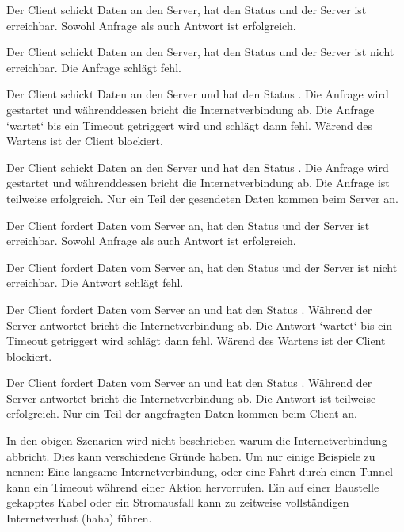 \begin{description}[leftmargin=0.7cm,style=nextline]
\item[Szenario A0:]
Der Client schickt Daten an den Server, hat den Status  und der Server ist erreichbar. Sowohl Anfrage als auch Antwort ist erfolgreich.\\
\item[Szenario A1:]
Der Client schickt Daten an den Server, hat den Status  und der Server ist nicht erreichbar. Die Anfrage schlägt fehl.\\
\item[Szenario A2:]
Der Client schickt Daten an den Server und hat den Status . Die Anfrage wird gestartet und währenddessen bricht die Internetverbindung ab. Die Anfrage `wartet` bis ein Timeout getriggert wird und schlägt dann fehl. Wärend des Wartens ist der Client blockiert.\\
\item[Szenario A3:]
Der Client schickt Daten an den Server und hat den Status . Die Anfrage wird gestartet und währenddessen bricht die Internetverbindung ab. Die Anfrage ist teilweise erfolgreich. Nur ein Teil der gesendeten Daten kommen beim Server an.\\
\item[Szenario S0:]
Der Client fordert Daten vom Server an, hat den Status  und der Server ist erreichbar. Sowohl Anfrage als auch Antwort ist erfolgreich.\\
\item[Szenario S1:]
Der Client fordert Daten vom Server an, hat den Status  und der Server ist nicht erreichbar. Die Antwort schlägt fehl.\\
\item[Szenario S2:]
Der Client fordert Daten vom Server an und hat den Status . Während der Server antwortet bricht die Internetverbindung ab. Die Antwort `wartet` bis ein Timeout getriggert wird schlägt dann fehl. Wärend des Wartens ist der Client blockiert.\\
\item[Szenario S3:]
Der Client fordert Daten vom Server an und hat den Status . Während der Server antwortet bricht die Internetverbindung ab. Die Antwort ist teilweise erfolgreich. Nur ein Teil der angefragten Daten kommen beim Client an.
\end{description}
In den obigen Szenarien wird nicht beschrieben warum die Internetverbindung abbricht. Dies kann verschiedene Gründe haben. Um nur einige Beispiele zu nennen: Eine langsame Internetverbindung, oder eine Fahrt durch einen Tunnel kann ein Timeout während einer Aktion hervorrufen. Ein auf einer Baustelle gekapptes Kabel oder ein Stromausfall kann zu zeitweise vollständigen Internetverlust (haha) führen.
%
%
